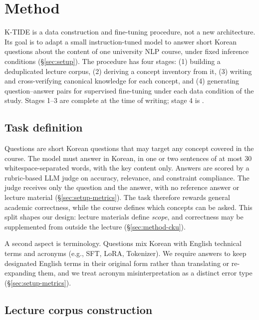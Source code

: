 \section{Method}
\label{sec:method}

K-TIDE is a data construction and fine-tuning procedure, not a new architecture.
Its goal is to adapt a small instruction-tuned model to answer short Korean questions about the content of one university NLP course, under fixed inference conditions (\S\ref{sec:setup}).
The procedure has four stages: (1) building a deduplicated lecture corpus, (2) deriving a concept inventory from it, (3) writing and cross-verifying canonical knowledge for each concept, and (4) generating question--answer pairs for supervised fine-tuning under each data condition of the study.
Stages 1--3 are complete at the time of writing; stage 4 is .

\subsection{Task definition}
\label{sec:method-task}

Questions are short Korean questions that may target any concept covered in the course.
The model must answer in Korean, in one or two sentences of at most 30 whitespace-separated words, with the key content only.
Answers are scored by a rubric-based LLM judge on accuracy, relevance, and constraint compliance.
The judge receives only the question and the answer, with no reference answer or lecture material (\S\ref{sec:setup-metrics}).
The task therefore rewards general academic correctness, while the course defines which concepts can be asked.
This split shapes our design: lecture materials define \emph{scope}, and correctness may be supplemented from outside the lecture (\S\ref{sec:method-cku}).

A second aspect is terminology.
Questions mix Korean with English technical terms and acronyms (e.g., SFT, LoRA, Tokenizer).
We require answers to keep designated English terms in their original form rather than translating or re-expanding them, and we treat acronym misinterpretation as a distinct error type (\S\ref{sec:setup-metrics}).

\subsection{Lecture corpus construction}
\label{sec:method-corpus}

